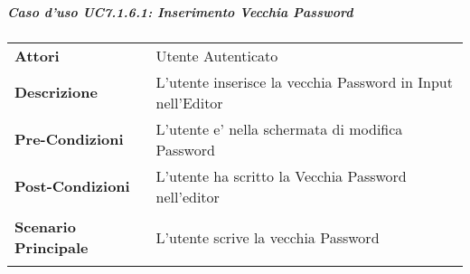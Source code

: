 \subparagraph{Caso d'uso UC7.1.6.1:  Inserimento Vecchia Password}
\label{UC7_1_6_1}

\begin{tabular}{ l | p{11cm}}
	\hline
	\rowcolor{Gray}
	 \multicolumn{2}{c}{UC7.1.6.1:  Inserimento Vecchia Password} \\
	 \hline
	\textbf{Attori} & Utente Autenticato \\
	\textbf{Descrizione} & L'utente inserisce la vecchia Password in Input nell'Editor\\
	\textbf{Pre-Condizioni} & L'utente e' nella schermata di modifica Password\\
	\textbf{Post-Condizioni} & L'utente ha scritto la Vecchia Password nell'editor\\
	\textbf{Scenario Principale} & 
	\begin{enumerate*}[label=(\arabic*.),itemjoin={\newline}]
		\item L'utente scrive la vecchia Password
	\end{enumerate*}\\
\end{tabular}